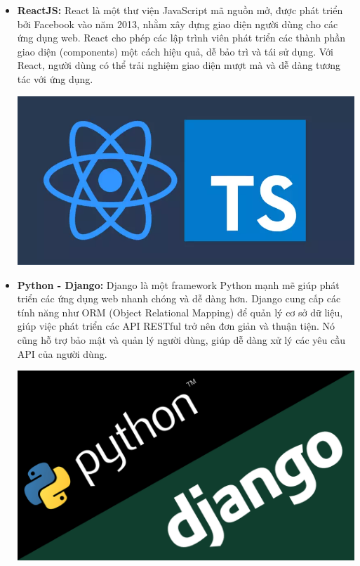\begin{itemize}
    \item \textbf{ReactJS:} React là một thư viện JavaScript mã nguồn mở, được phát triển bởi Facebook vào năm 2013, nhằm xây dựng giao diện người dùng cho các ứng dụng web. React cho phép các lập trình viên phát triển các thành phần giao diện (components) một cách hiệu quả, dễ bảo trì và tái sử dụng. Với React, người dùng có thể trải nghiệm giao diện mượt mà và dễ dàng tương tác với ứng dụng.
    
    \includegraphics[width=\textwidth]{imgs/react.png}
\end{itemize}

\begin{itemize}
    \item \textbf{Python - Django:} Django là một framework Python mạnh mẽ giúp phát triển các ứng dụng web nhanh chóng và dễ dàng hơn. Django cung cấp các tính năng như ORM (Object Relational Mapping) để quản lý cơ sở dữ liệu, giúp việc phát triển các API RESTful trở nên đơn giản và thuận tiện. Nó cũng hỗ trợ bảo mật và quản lý người dùng, giúp dễ dàng xử lý các yêu cầu API của người dùng.
    
    \includegraphics[width=\textwidth]{imgs/django.png}
\end{itemize}

